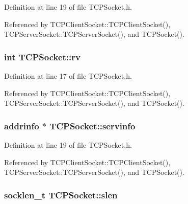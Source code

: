 Definition at line 19 of file T\+C\+P\+Socket.\+h.



Referenced by T\+C\+P\+Client\+Socket\+::\+T\+C\+P\+Client\+Socket(), T\+C\+P\+Server\+Socket\+::\+T\+C\+P\+Server\+Socket(), and T\+C\+P\+Socket().

\hypertarget{classTCPSocket_a2f6471b799685ee580a9cfa5d94ac3a7}{
\subsubsection[{rv}]{\setlength{\rightskip}{0pt plus 5cm}int T\+C\+P\+Socket\+::rv\hspace{0.3cm}{\ttfamily [protected]}}}\label{classTCPSocket_a2f6471b799685ee580a9cfa5d94ac3a7}


Definition at line 17 of file T\+C\+P\+Socket.\+h.



Referenced by T\+C\+P\+Client\+Socket\+::\+T\+C\+P\+Client\+Socket(), T\+C\+P\+Server\+Socket\+::\+T\+C\+P\+Server\+Socket(), and T\+C\+P\+Socket().

\hypertarget{classTCPSocket_a79ce3d1a12b7371a6838dad34d0e8cf3}{
\subsubsection[{servinfo}]{\setlength{\rightskip}{0pt plus 5cm}addrinfo $\ast$ T\+C\+P\+Socket\+::servinfo\hspace{0.3cm}{\ttfamily [protected]}}}\label{classTCPSocket_a79ce3d1a12b7371a6838dad34d0e8cf3}


Definition at line 19 of file T\+C\+P\+Socket.\+h.



Referenced by T\+C\+P\+Client\+Socket\+::\+T\+C\+P\+Client\+Socket(), T\+C\+P\+Server\+Socket\+::\+T\+C\+P\+Server\+Socket(), and T\+C\+P\+Socket().

\hypertarget{classTCPSocket_a9613e3899f39278d0de6fab677bb1edc}{
\subsubsection[{slen}]{\setlength{\rightskip}{0pt plus 5cm}socklen\+\_\+t T\+C\+P\+Socket\+::slen\hspace{0.3cm}{\ttfamily [protected]}}}\label{classTCPSocket_a9613e3899f39278d0de6fab677bb1edc}


